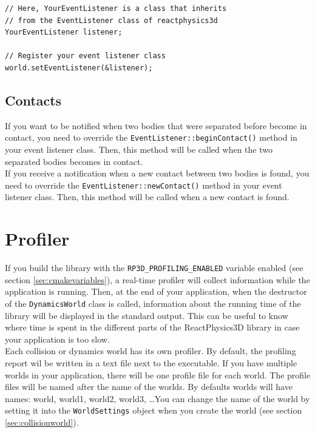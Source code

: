 \documentclass[a4paper,12pt]{article}
\begin{document}
    \begin{lstlisting}
// Here, YourEventListener is a class that inherits
// from the EventListener class of reactphysics3d
YourEventListener listener;

// Register your event listener class
world.setEventListener(&listener);
  \end{lstlisting}

    \subsection{Contacts}

   If you want to be notified when two bodies that were separated before become in contact, you need to override the \texttt{EventListener::beginContact()} method in your event
   listener class. Then, this method will be called when the two separated bodies becomes in contact. \\

   If you receive a notification when a new contact between two bodies is found, you need to override the \texttt{EventListener::newContact()} method in your event listener class. Then, this
   method will be called when a new contact is found.

    \section{Profiler}
    \label{sec:profiler}

    If you build the library with the \texttt{RP3D\_PROFILING\_ENABLED} variable enabled (see section \ref{sec:cmakevariables}), a real-time profiler will collect information while the application
    is running. Then, at the end of your application, when the destructor of the \texttt{DynamicsWorld} class is called, information about the running time of the library will be displayed in the
    standard output. This can be useful to know where time is spent in the different parts of the ReactPhysics3D library in case your application is too slow. \\

    Each collision or dynamics world has its own profiler. By default, the profiling report wil be written in a text file next to the executable.
    If you have multiple worlds in your application, there will be one profile file for each world. The profile files will be named after the
    name of the worlds. By defaults worlds will have names: world, world1, world2, world3, \dots You can change the name of the world by
    setting it into the \texttt{WorldSettings} object when you create the world (see section \ref{sec:collisionworld}). \\
\end{document}

